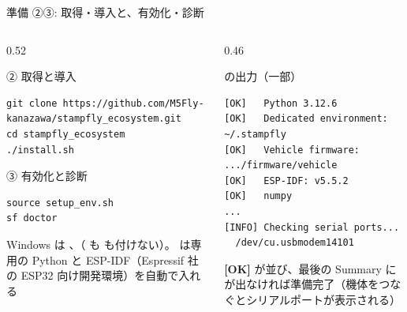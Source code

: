 \begin{frame}[fragile]{準備 ②③: 取得・導入と、有効化・診断}
  \begin{columns}[T]
    \begin{column}{0.52\textwidth}
      \begin{exampleblock}{② 取得と導入}
        \begin{lstlisting}[style=sfbash, numbers=none, basicstyle=\ttfamily\scriptsize, aboveskip=1pt, belowskip=1pt]
git clone https://github.com/M5Fly-kanazawa/stampfly_ecosystem.git
cd stampfly_ecosystem
./install.sh
        \end{lstlisting}
      \end{exampleblock}
      \begin{exampleblock}{③ 有効化と診断}
        \begin{lstlisting}[style=sfbash, numbers=none, basicstyle=\ttfamily\scriptsize, aboveskip=1pt, belowskip=1pt]
source setup_env.sh
sf doctor
        \end{lstlisting}
      \end{exampleblock}
      {\scriptsize Windows は 、（ も  も付けない）。 は専用の Python と ESP-IDF（Espressif 社の ESP32 向け開発環境）を自動で入れる\par}
    \end{column}
    \begin{column}{0.46\textwidth}
      \begin{alertblock}{ の出力（一部）}
        \begin{lstlisting}[style=sfbash, numbers=none, basicstyle=\ttfamily\tiny, aboveskip=1pt, belowskip=1pt]
[OK]   Python 3.12.6
[OK]   Dedicated environment: ~/.stampfly
[OK]   Vehicle firmware: .../firmware/vehicle
[OK]   ESP-IDF: v5.5.2
[OK]   numpy
...
[INFO] Checking serial ports...
  /dev/cu.usbmodem14101
        \end{lstlisting}
      \end{alertblock}
      {\footnotesize \textcolor{sfgreen}{\textbf{[OK]}} が並び、最後の Summary に \code{[WARN]} が出なければ準備完了（機体をつなぐとシリアルポートが表示される）\par}
    \end{column}
  \end{columns}
\end{frame}

